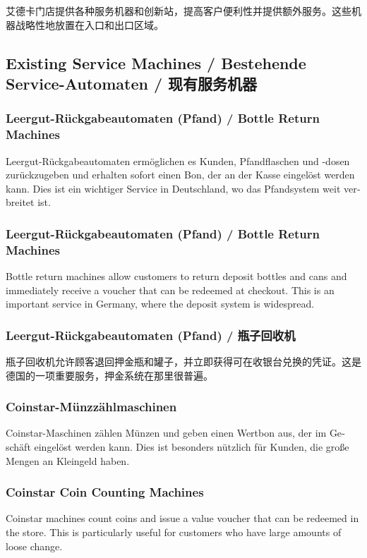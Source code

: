 艾德卡门店提供各种服务机器和创新站，提高客户便利性并提供额外服务。这些机器战略性地放置在入口和出口区域。

\subsection{Existing Service Machines / Bestehende Service-Automaten / 现有服务机器}

\begin{otherlanguage}{ngerman}
\subsubsection{Leergut-Rückgabeautomaten (Pfand) / Bottle Return Machines}
Leergut-Rückgabeautomaten ermöglichen es Kunden, Pfandflaschen und -dosen zurückzugeben und erhalten sofort einen Bon, der an der Kasse eingelöst werden kann. Dies ist ein wichtiger Service in Deutschland, wo das Pfandsystem weit verbreitet ist.
\end{otherlanguage}

\subsubsection{Leergut-Rückgabeautomaten (Pfand) / Bottle Return Machines}
Bottle return machines allow customers to return deposit bottles and cans and immediately receive a voucher that can be redeemed at checkout. This is an important service in Germany, where the deposit system is widespread.

\subsubsection{Leergut-Rückgabeautomaten (Pfand) / 瓶子回收机}
瓶子回收机允许顾客退回押金瓶和罐子，并立即获得可在收银台兑换的凭证。这是德国的一项重要服务，押金系统在那里很普遍。

\begin{otherlanguage}{ngerman}
\subsubsection{Coinstar-Münzzählmaschinen}
Coinstar-Maschinen zählen Münzen und geben einen Wertbon aus, der im Geschäft eingelöst werden kann. Dies ist besonders nützlich für Kunden, die große Mengen an Kleingeld haben.
\end{otherlanguage}

\subsubsection{Coinstar Coin Counting Machines}
Coinstar machines count coins and issue a value voucher that can be redeemed in the store. This is particularly useful for customers who have large amounts of loose change.

